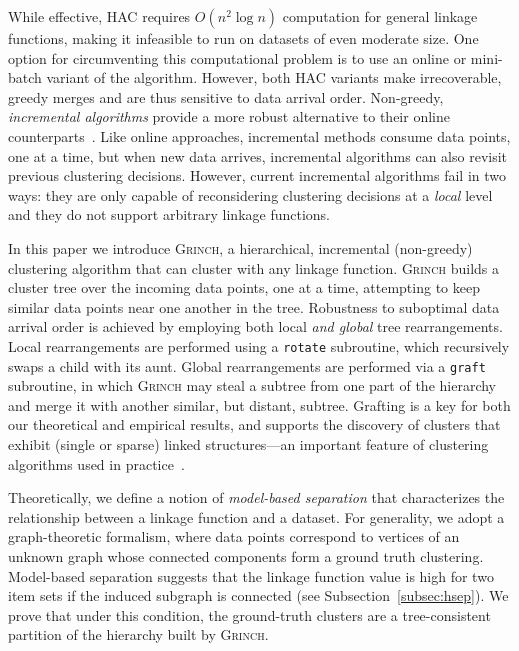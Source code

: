 \documentclass{article} \usepackage[utf8]{inputenc} \usepackage[T1]{fontenc}    \usepackage{hyperref}       \usepackage{url}            \usepackage{booktabs}       \usepackage{amsfonts}       \usepackage{nicefrac}       \usepackage{microtype}      \usepackage{geometry}
\newcommand{\alg}{\textsc{Grinch}\xspace}
\newcommand{\records}{data points\xspace}
\newcommand{\hac}{\textsc{HAC}\xspace}
\newcommand{\graft}{\texttt{graft}\xspace}
\newcommand{\rotate}{\texttt{rotate}\xspace}
\newcommand{\hof}{linkage function\xspace}
\newcommand{\hofs}{linkage functions\xspace}
\begin{document}
While effective, \hac requires $O(n^2\log n)$ computation for general
\hofs, making it infeasible to run on datasets of even moderate
size. One option for circumventing this computational problem is to
use an online or mini-batch variant of the algorithm.  However, both
\hac variants make irrecoverable, greedy merges and are thus sensitive
to data arrival order.  Non-greedy, \emph{incremental algorithms}
provide a more robust alternative to their online
counterparts~\cite{kobren2017hierarchical, zhang1996birch}. Like
online approaches, incremental methods consume \records, one at a time,
but when new data arrives, incremental algorithms can also revisit
previous clustering decisions. However, current incremental algorithms
fail in two ways: they are only capable of reconsidering clustering
decisions at a \emph{local} level and they do not support arbitrary
\hofs \cite{kobren2017hierarchical, zhang1996birch}.

In this paper we introduce \alg, a hierarchical, incremental
(non-greedy) clustering algorithm that can cluster with any \hof. \alg
builds a cluster tree over the incoming \records, one at a time,
attempting to keep similar \records near one another in the
tree. Robustness to suboptimal data arrival order is achieved by
employing both local \emph{and global} tree rearrangements.  Local
rearrangements are performed using a \rotate subroutine, which
recursively swaps a child with its aunt. Global rearrangements are
performed via a \graft subroutine, in which \alg may steal a subtree
from one part of the hierarchy and merge it with another similar, but
distant, subtree. Grafting is a key for both our theoretical and
empirical results, and supports the discovery of clusters that exhibit
(single or sparse) linked structures---an important feature of
clustering algorithms used in practice~\cite{ester1996density}.

Theoretically, we define a notion of \emph{model-based separation}
that characterizes the relationship between a \hof and a dataset.  For
generality, we adopt a graph-theoretic formalism, where \records
correspond to vertices of an unknown graph whose connected components
form a ground truth clustering. Model-based separation suggests that
the \hof value is high for two item sets if the induced subgraph is
connected (see Subsection~\ref{subsec:hsep}).  We prove that under
this condition, the ground-truth clusters are a tree-consistent
partition of the hierarchy built by \alg.
\end{document}
